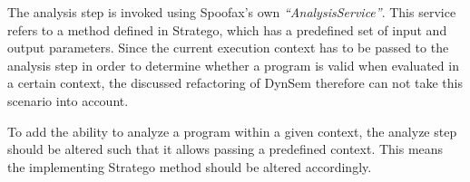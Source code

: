 The analysis step is invoked using Spoofax's own \textit{``AnalysisService''}.
This service refers to a method defined in Stratego, which has a predefined
set of input and output parameters. Since the current execution context has
to be passed to the analysis step in order to determine whether a program is
valid when evaluated in a certain context, the discussed refactoring of
DynSem therefore can not take this scenario into account.

To add the ability to analyze a program within a given context, the analyze
step should be altered such that it allows passing a predefined context.
This means the implementing Stratego method should be altered accordingly.

